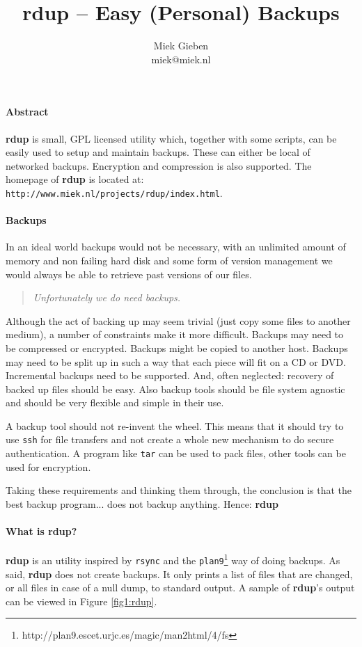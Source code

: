 \documentclass[a4, 10pt]{article}
\newcommand{\rdup}{\textbf{rdup}}
\newcommand{\cmd}[1]{\texttt{#1}}
\newcommand{\url}[1]{\texttt{#1}}
\begin{document}
\pagestyle{empty}

\title{\rdup{} -- Easy (Personal) Backups}
\author{Miek Gieben\\miek@miek.nl}
\date{}
\maketitle
\thispagestyle{empty}

\paragraph{Abstract}
\rdup{} is small, GPL licensed utility which, together with some scripts, can
be easily used to setup and maintain backups. These can either be local
of networked backups. Encryption and compression is also supported.
The homepage of \rdup{} is located at: \\
\url{http://www.miek.nl/projects/rdup/index.html}.

\paragraph{Backups}
In an ideal world backups would not be necessary, with an unlimited
amount of memory and non failing hard disk and some form of version
management we would always be able to retrieve past versions of our files.
\begin{quote}
\emph{Unfortunately we do need backups.}
\end{quote}
Although the act of backing up may seem trivial (just copy some files
to another medium), a number of constraints make it more difficult. 
Backups may need to be compressed or encrypted. Backups might be copied
to another host. Backups may need to be split up in such a way that
each piece will fit on a CD or DVD. Incremental backups need to be
supported. And, often neglected: recovery of backed up
files should be easy.  Also backup tools should be file system agnostic
and should be very flexible and simple in their use.

A backup tool should not re-invent the wheel.  This means that it should
try to use \cmd{ssh} for file transfers and not create a whole new
mechanism to do secure authentication. A program like \cmd{tar} can be
used to pack files, other tools can be used for encryption. 

Taking these requirements and thinking them through, the
conclusion is that the best backup program... does not backup anything.
Hence: \rdup

\paragraph{What is \rdup?}
\rdup{} is an utility inspired by \cmd{rsync} and the 
\cmd{plan9}\footnote{http://plan9.escet.urjc.es/magic/man2html/4/fs} 
way of doing backups. As said, \rdup{} does not create backups. It only
prints a list of files that are changed, or all files in case of a null
dump, to standard output. A sample of \rdup's output can be viewed in
Figure \ref{fig1:rdup}.
\end{document}
